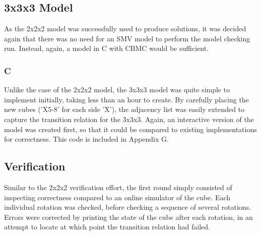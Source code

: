 \documentclass{article}
\begin{document}
\subsection {3x3x3 Model}

As the 2x2x2 model was successfully used to produce solutions, it was decided again that there was no need for an SMV model to perform the model checking run. Instead, again, a model in C with CBMC would be sufficient.

\subsubsection {C}

Unlike the case of the 2x2x2 model, the 3x3x3 model was quite simple to implement initially, taking less than an hour to create. By carefully placing the new cubes ('X5-8' for each side 'X'), the adjacency list was easily extended to capture the transition relation for the 3x3x3. Again, an interactive version of the model was created first, so that it could be compared to existing implementations for correctness. This code is included in Appendix G.

\subsection {Verification}

Similar to the 2x2x2 verification effort, the first round simply consisted of inspecting correctness compared to an online simulator of the cube. Each individual rotation was checked, before checking a sequence of several rotations. Errors were corrected by printing the state of the cube after each rotation, in an attempt to locate at which point the transition relation had failed.\\
\end{document}
